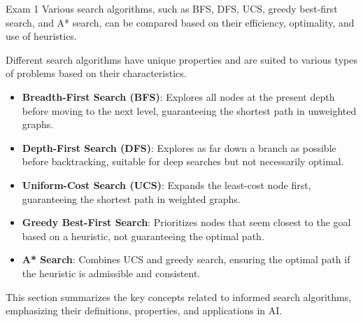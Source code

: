 \begin{examnotes}{Exam 1}
    Various search algorithms, such as BFS, DFS, UCS, greedy best-first search, and A* search, can be compared based on their efficiency, optimality, and use of heuristics.
    
    \begin{highlight}
        Different search algorithms have unique properties and are suited to various types of problems based on their characteristics.
        
        \begin{itemize}
            \item \textbf{Breadth-First Search (BFS)}: Explores all nodes at the present depth before moving to the next level, guaranteeing the shortest path in unweighted graphs.
            \item \textbf{Depth-First Search (DFS)}: Explores as far down a branch as possible before backtracking, suitable for deep searches but not necessarily optimal.
            \item \textbf{Uniform-Cost Search (UCS)}: Expands the least-cost node first, guaranteeing the shortest path in weighted graphs.
            \item \textbf{Greedy Best-First Search}: Prioritizes nodes that seem closest to the goal based on a heuristic, not guaranteeing the optimal path.
            \item \textbf{A* Search}: Combines UCS and greedy search, ensuring the optimal path if the heuristic is admissible and consistent.
        \end{itemize}
    \end{highlight}

    \begin{highlight}
        This section summarizes the key concepts related to informed search algorithms, emphasizing their definitions, properties, and applications in AI.
        

\end{highlight}
\end{examnotes}
